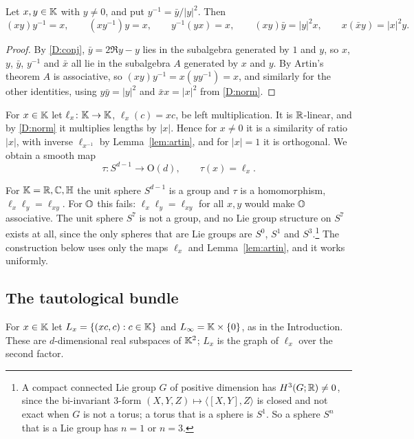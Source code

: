 \begin{lemma}\label{lem:artin}
Let $x,y\in\mathbb{K}$ with $y\neq0$, and put $y^{-1}=\bar y/|y|^2$. Then
\[
(xy)y^{-1}=x,\qquad (xy^{-1})y=x,\qquad y^{-1}(yx)=x,\qquad (xy)\bar y=|y|^2x,\qquad x(\bar x y)=|x|^2y .
\]
\end{lemma}

\begin{proof}
By \ref{D:conj}, $\bar y=2\Re y-y$ lies in the subalgebra generated by $1$ and $y$, so $x$, $y$, $\bar y$, $y^{-1}$ and $\bar x$ all lie in the subalgebra $A$ generated by $x$ and $y$. By Artin's theorem $A$ is associative, so $(xy)y^{-1}=x(yy^{-1})=x$, and similarly for the other identities, using $y\bar y=|y|^2$ and $\bar x x=|x|^2$ from \ref{D:norm}.
\end{proof}

For $x\in\mathbb{K}$ let $\ell_x\colon\mathbb{K}\to\mathbb{K}$, $\ell_x(c)=xc$, be left multiplication. It is $\mathbb{R}$-linear, and by \ref{D:norm} it multiplies lengths by $|x|$. Hence for $x\neq0$ it is a similarity of ratio $|x|$, with inverse $\ell_{x^{-1}}$ by Lemma~\ref{lem:artin}, and for $|x|=1$ it is orthogonal. We obtain a smooth map
\begin{equation}\label{eq:clutch}
\tau\colon S^{d-1}\to \mathrm{O}(d),\qquad \tau(x)=\ell_x .
\end{equation}

\begin{remark}\label{rem:notgroup}
For $\mathbb{K}=\mathbb{R},\mathbb{C},\mathbb{H}$ the unit sphere $S^{d-1}$ is a group and $\tau$ is a homomorphism, $\ell_x\ell_y=\ell_{xy}$. For $\mathbb{O}$ this fails: $\ell_x\ell_y=\ell_{xy}$ for all $x,y$ would make $\mathbb{O}$ associative. The unit sphere $S^7$ is not a group, and no Lie group structure on $S^7$ exists at all, since the only spheres that are Lie groups are $S^0$, $S^1$ and $S^3$.\footnote{A compact connected Lie group $G$ of positive dimension has $H^3(G;\mathbb{R})\neq0$, since the bi-invariant $3$-form $(X,Y,Z)\mapsto\langle[X,Y],Z\rangle$ is closed and not exact when $G$ is not a torus; a torus that is a sphere is $S^1$. So a sphere $S^n$ that is a Lie group has $n=1$ or $n=3$.} The construction below uses only the maps $\ell_x$ and Lemma~\ref{lem:artin}, and it works uniformly.
\end{remark}

\subsection{The tautological bundle}\label{sec:taut}

For $x\in\mathbb{K}$ let $L_x=\{(xc,c):c\in\mathbb{K}\}$ and $L_\infty=\mathbb{K}\times\{0\}$, as in the Introduction. These are $d$-dimensional real subspaces of $\mathbb{K}^2$; $L_x$ is the graph of $\ell_x$ over the second factor.

